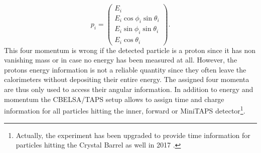 \begin{equation}
		p_i=\begin{pmatrix}
		E_i\\E_i\cos\phi_i\sin\theta_i\\E_i\sin\phi_i\sin\theta_i\\E_i\cos\theta_i 
	\end{pmatrix}.
\end{equation}
This four momentum is wrong if the detected particle is a proton since it has non vanishing mass or in case no energy has been measured at all. However, the protons energy information is not a reliable quantity since they often leave the calorimeters without depositing their entire energy. The assigned four momenta are thus only used to access their angular information. In addition to energy and momentum the CBELSA/TAPS setup allows to assign time and charge information for all particles hitting the inner, forward or MiniTAPS detector\footnote{Actually, the experiment has been upgraded to provide time information for particles hitting the Crystal Barrel as well in 2017 \cite{urban}.}. 
